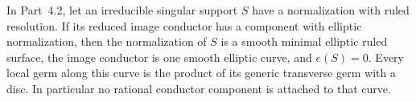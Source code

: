 
\begin{proposition}[P4R.13]\hypertarget{tag-02Y6}{}\label{night:P4R.13}\label{stmt:P4R.13}


In Part~4.2, let an irreducible singular support $S$ have a
normalization with ruled resolution. If its reduced image
conductor has a component with elliptic normalization, then
the normalization of $S$ is a smooth minimal elliptic ruled
surface, the image conductor is one smooth elliptic curve,
and $e(S)=0$. Every local germ along this curve is the product
of its generic transverse germ with a disc. In particular no
rational conductor component is attached to that curve.
\end{proposition}

